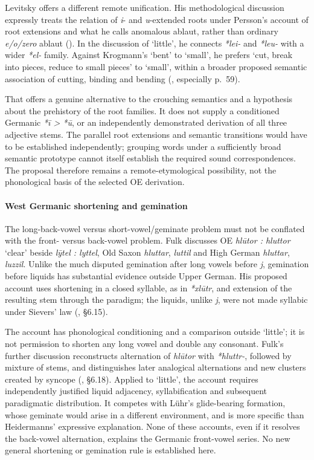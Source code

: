 \documentclass[
  british,
  a4paper,
]{article}
\begin{document}
Levitsky offers a different remote unification. His methodological
discussion expressly treats the relation of \emph{i}- and
\emph{u}-extended roots under Persson's account of root extensions and
what he calls anomalous ablaut, rather than ordinary \emph{e/o/zero}
ablaut (). In the
discussion of `little', he connects \emph{*lei-} and \emph{*leu-} with a
wider \emph{*el-} family. Against Krogmann's `bent' to `small', he
prefers `cut, break into pieces, reduce to small pieces' to `small',
within a broader proposed semantic association of cutting, binding and
bending (, especially
p.~59).

That offers a genuine alternative to the crouching semantics and a
hypothesis about the prehistory of the root families. It does not supply
a conditioned Germanic \emph{*ī > *ū}, or an independently demonstrated
derivation of all three adjective stems. The parallel root extensions
and semantic transitions would have to be established independently;
grouping words under a sufficiently broad semantic prototype cannot
itself establish the required sound correspondences. The proposal
therefore remains a remote-etymological possibility, not the
phonological basis of the selected OE derivation.

\paragraph{West Germanic shortening and
gemination}\label{west-germanic-shortening-and-gemination}

The long-back-vowel versus short-vowel/geminate problem must not be
conflated with the front- versus back-vowel problem. Fulk discusses OE
\emph{hlūtor : hluttor} `clear' beside \emph{lȳtel : lyttel}, Old Saxon
\emph{hluttar}, \emph{luttil} and High German \emph{hluttar},
\emph{luzzil}. Unlike the much disputed gemination after long vowels
before \emph{j}, gemination before liquids has substantial evidence
outside Upper German. His proposed account uses shortening in a closed
syllable, as in \emph{*xlūtr}, and extension of the resulting stem
through the paradigm; the liquids, unlike \emph{j}, were not made
syllabic under Sievers' law (,
§6.15).

The account has phonological conditioning and a comparison outside
`little'; it is not permission to shorten any long vowel and double any
consonant. Fulk's further discussion reconstructs alternation of
\emph{hlūtor} with \emph{*hluttr-}, followed by mixture of stems, and
distinguishes later analogical alternations and new clusters created by
syncope (, §6.18). Applied to
`little', the account requires independently justified liquid adjacency,
syllabification and subsequent paradigmatic distribution. It competes
with Lühr's glide-bearing formation, whose geminate would arise in a
different environment, and is more specific than Heidermanns' expressive
explanation. None of these accounts, even if it resolves the back-vowel
alternation, explains the Germanic front-vowel series. No new general
shortening or gemination rule is established here.
\end{document}
